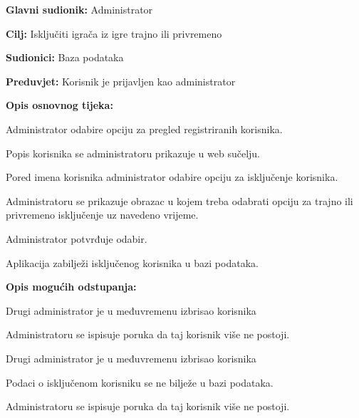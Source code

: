 				\noindent {}
				\begin{packed_item}
					
					\item \textbf{Glavni sudionik: }Administrator
					\item  \textbf{Cilj:} Isključiti igrača iz igre trajno ili privremeno
					\item  \textbf{Sudionici:} Baza podataka
					\item  \textbf{Preduvjet:} Korisnik je prijavljen kao administrator
					\item  \textbf{Opis osnovnog tijeka:}
					
					\item[] \begin{packed_enum}
						
						\item Administrator odabire opciju za pregled registriranih korisnika.
						\item Popis korisnika se administratoru prikazuje u web sučelju.
						\item Pored imena korisnika administrator odabire opciju za isključenje korisnika.
						\item Administratoru se prikazuje obrazac u kojem treba odabrati opciju za trajno ili privremeno isključenje uz navedeno vrijeme.
						\item Administrator potvrđuje odabir.
						\item Aplikacija zabilježi isključenog korisnika u bazi podataka.
					\end{packed_enum}
					
					\item  \textbf{Opis mogućih odstupanja:}
					
					\item[] \begin{packed_item}
						
						\item[3.a] Drugi administrator je u međuvremenu izbrisao korisnika
						\item[] \begin{packed_enum}
							
							\item Administratoru se ispisuje poruka da taj korisnik više ne postoji.
							
						\end{packed_enum}
						\item[5.a] Drugi administrator je u međuvremenu izbrisao korisnika
						\item[] \begin{packed_enum}
							
							\item Podaci o isključenom korisniku se ne bilježe u bazi podataka.
							\item Administratoru se ispisuje poruka da taj korisnik više ne postoji.
							
						\end{packed_enum}
						
					\end{packed_item}
				\end{packed_item}
				
